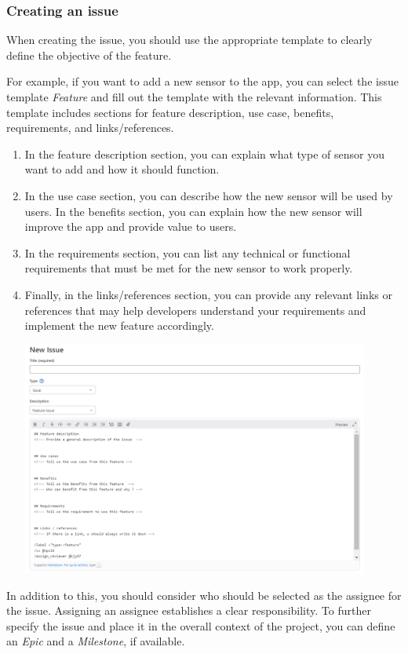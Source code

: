 \documentclass[12pt]{article}
\begin{document}
\subsubsection{Creating an issue}
When creating the issue, you should use the appropriate template to clearly define the objective of the feature. 

For example, if you want to add a new sensor to the app, you can select the issue template \textit{Feature} and fill out the template with the relevant information. This template includes sections for feature description, use case, benefits, requirements, and links/references. 
 \begin{enumerate}
      \item
      In the feature description section, you can explain what type of sensor you want to add and how it should function. 
      \item
      In the use case section, you can describe how the new sensor will be used by users. In the benefits section, you can explain how the new sensor will improve the app and provide value to users. 
      \item
      In the requirements section, you can list any technical or functional requirements that must be met for the new sensor to work properly. 
      \item
      Finally, in the links/references section, you can provide any relevant links or references that may help developers understand your requirements and implement the new feature accordingly. 
      

    \includegraphics[width=0.9\textwidth]{issue.png}
  
 \end{enumerate}

In addition to this, you should consider who should be selected as the assignee for the issue. Assigning an assignee establishes a clear responsibility. To further specify the issue and place it in the overall context of the project, you can define an \textit{Epic} and a \textit{Milestone}, if available. 
\end{document}

